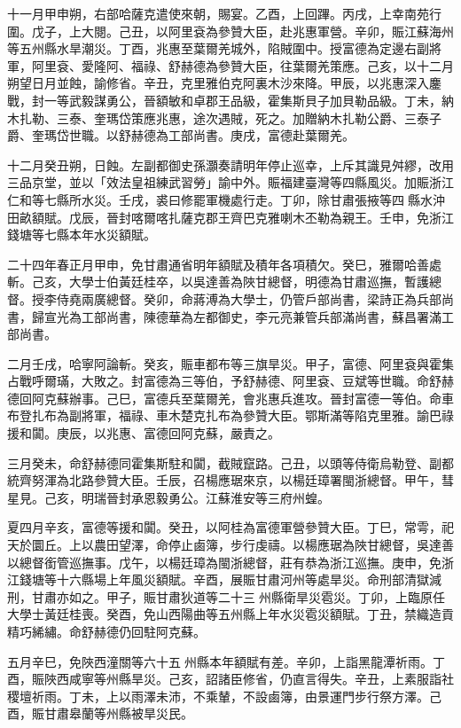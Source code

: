 \begin{pinyinscope}
十一月甲申朔，右部哈薩克遣使來朝，賜宴。乙酉，上回蹕。丙戌，上幸南苑行圍。戊子，上大閱。己丑，以阿里袞為參贊大臣，赴兆惠軍營。辛卯，賑江蘇海州等五州縣水旱潮災。丁酉，兆惠至葉爾羌城外，陷賊圍中。授富德為定邊右副將軍，阿里袞、愛隆阿、福祿、舒赫德為參贊大臣，往葉爾羌策應。己亥，以十二月朔望日月並蝕，諭修省。辛丑，克里雅伯克阿裏木沙來降。甲辰，以兆惠深入鏖戰，封一等武毅謀勇公，晉額敏和卓郡王品級，霍集斯貝子加貝勒品級。丁未，納木扎勒、三泰、奎瑪岱策應兆惠，途次遇賊，死之。加贈納木扎勒公爵、三泰子爵、奎瑪岱世職。以舒赫德為工部尚書。庚戌，富德赴葉爾羌。

十二月癸丑朔，日蝕。左副都御史孫灝奏請明年停止巡幸，上斥其識見舛繆，改用三品京堂，並以「效法皇祖練武習勞」諭中外。賑福建臺灣等四縣風災。加賑浙江仁和等七縣所水災。壬戌，裘曰修罷軍機處行走。丁卯，除甘肅張掖等四縣水沖田畝額賦。戊辰，晉封喀爾喀扎薩克郡王齊巴克雅喇木丕勒為親王。壬申，免浙江錢塘等七縣本年水災額賦。

二十四年春正月甲申，免甘肅通省明年額賦及積年各項積欠。癸巳，雅爾哈善處斬。己亥，大學士伯黃廷桂卒，以吳達善為陜甘總督，明德為甘肅巡撫，暫護總督。授李侍堯兩廣總督。癸卯，命蔣溥為大學士，仍管戶部尚書，梁詩正為兵部尚書，歸宣光為工部尚書，陳德華為左都御史，李元亮兼管兵部滿尚書，蘇昌署滿工部尚書。

二月壬戌，哈寧阿論斬。癸亥，賑車都布等三旗旱災。甲子，富德、阿里袞與霍集占戰呼爾璊，大敗之。封富德為三等伯，予舒赫德、阿里袞、豆斌等世職。命舒赫德回阿克蘇辦事。己巳，富德兵至葉爾羌，會兆惠兵進攻。晉封富德一等伯。命車布登扎布為副將軍，福祿、車木楚克扎布為參贊大臣。鄂斯滿等陷克里雅。諭巴祿援和闐。庚辰，以兆惠、富德回阿克蘇，嚴責之。

三月癸未，命舒赫德同霍集斯駐和闐，截賊竄路。己丑，以頭等侍衛烏勒登、副都統齊努渾為北路參贊大臣。壬辰，召楊應琚來京，以楊廷璋署閩浙總督。甲午，彗星見。己亥，明瑞晉封承恩毅勇公。江蘇淮安等三府州蝗。

夏四月辛亥，富德等援和闐。癸丑，以阿桂為富德軍營參贊大臣。丁巳，常雩，祀天於圜丘。上以農田望澤，命停止鹵簿，步行虔禱。以楊應琚為陜甘總督，吳達善以總督銜管巡撫事。戊午，以楊廷璋為閩浙總督，莊有恭為浙江巡撫。庚申，免浙江錢塘等十六縣場上年風災額賦。辛酉，展賑甘肅河州等處旱災。命刑部清獄減刑，甘肅亦如之。甲子，賑甘肅狄道等二十三州縣衛旱災雹災。丁卯，上臨原任大學士黃廷桂喪。癸酉，免山西陽曲等五州縣上年水災雹災額賦。丁丑，禁織造貢精巧絺繡。命舒赫德仍回駐阿克蘇。

五月辛巳，免陜西潼關等六十五州縣本年額賦有差。辛卯，上詣黑龍潭祈雨。丁酉，賑陜西咸寧等州縣旱災。己亥，詔諸臣修省，仍直言得失。辛丑，上素服詣社稷壇祈雨。丁未，上以雨澤未沛，不乘輦，不設鹵簿，由景運門步行祭方澤。己酉，賑甘肅皋蘭等州縣被旱災民。


\end{pinyinscope}

